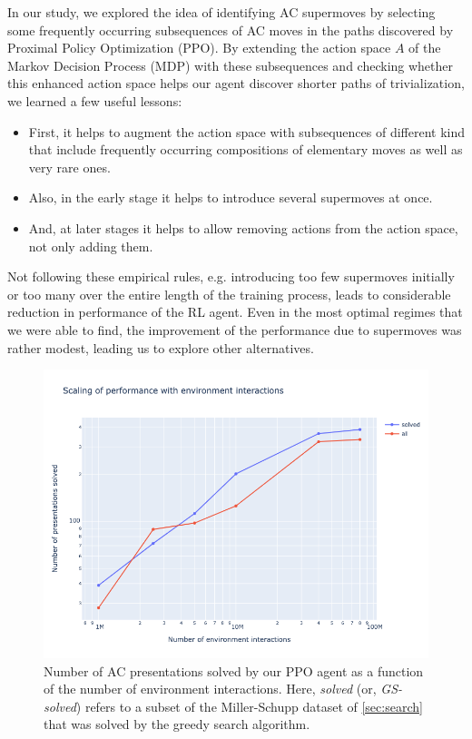 In our study, we explored the idea of identifying AC supermoves by selecting some frequently occurring subsequences of AC moves in the paths discovered by Proximal Policy Optimization (PPO). By extending the action space $A$ of the Markov Decision Process (MDP) with these subsequences and checking whether this enhanced action space helps our agent discover shorter paths of trivialization, we learned a few useful lessons:

\begin{itemize}

\item First, it helps to augment the action space with subsequences of different kind that include frequently occurring compositions of elementary moves as well as very rare ones.

\item  Also, in the early stage it helps to introduce several supermoves at once.

\item And, at later stages it helps to allow removing actions from the action space, not only adding them.
    
\end{itemize}

\noindent
Not following these empirical rules, e.g. introducing too few supermoves initially or too many over the entire length of the training process, leads to considerable reduction in performance of the RL agent. Even in the most optimal regimes that we were able to find, the improvement of the performance due to supermoves was rather modest, leading us to explore other alternatives.

\begin{figure}
	\centering
	\includegraphics[scale=0.45]{fig/scaling_env.png}
	\caption{Number of AC presentations solved by our PPO agent as a function of the number of environment interactions. Here, \textit{solved} (or, \textit{GS-solved}) refers to a subset of the Miller-Schupp dataset of \autoref{sec:search} that was solved by the greedy search algorithm.}
	\label{fig:scaling_env}
\end{figure}


